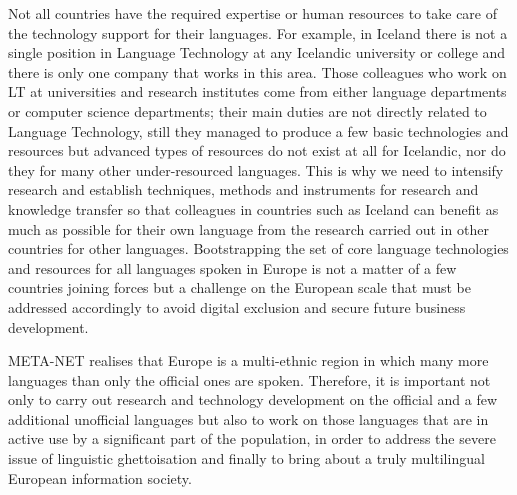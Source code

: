 \documentclass[10pt, plain]{../../metanetpaper}
\begin{document}
\begin{multicols}{2}
Not all countries have the required expertise or human resources to take care of the technology support for their languages. For example, in Iceland there is not a single position in Language Technology at any Icelandic university or college and there is only one company that works in this area. Those colleagues who work on LT at universities and research institutes come from either language departments or computer science departments; their main duties are not directly related to Language Technology, still they managed to produce a few basic technologies and resources but advanced types of resources do not exist at all for Icelandic, nor do they for many other under-resourced languages. This is why we need to intensify research and establish techniques, methods and instruments for research and knowledge transfer so that colleagues in countries such as Iceland can benefit as much as possible for their own language from the research carried out in other countries for other languages. Bootstrapping the set of core language technologies and resources for all languages spoken in Europe is not a matter of a few countries joining forces but a challenge on the European scale that must be addressed accordingly to avoid digital exclusion and secure future business development.

META-NET realises that Europe is a multi-ethnic region in which many more languages than only the official ones are spoken. Therefore, it is important not only to carry out research and technology development on the official and a few additional unofficial languages but also to work on those languages that are in active use by a significant part of the population, in order to address the severe issue of linguistic ghettoisation and finally to bring about a truly multilingual European information society.


\end{multicols}
\end{document}
